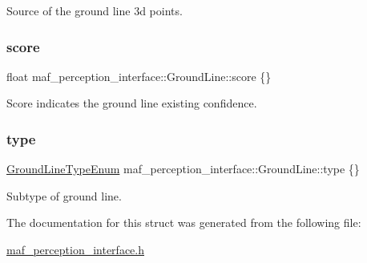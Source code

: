 Source of the ground line 3d points. 

\mbox{\label{structmaf__perception__interface_1_1GroundLine_a2ae2c5f4b0dd669de6225478eb4f5006}} 
\subsubsection{\texorpdfstring{score}{score}}
{\footnotesize\ttfamily float maf\+\_\+perception\+\_\+interface\+::\+Ground\+Line\+::score \{\}}



Score indicates the ground line existing confidence. 

\mbox{\label{structmaf__perception__interface_1_1GroundLine_a1c29c46eaad71b036c40cd5dbfe483c6}} 
\subsubsection{\texorpdfstring{type}{type}}
{\footnotesize\ttfamily \hyperlink{structmaf__perception__interface_1_1GroundLineTypeEnum}{Ground\+Line\+Type\+Enum} maf\+\_\+perception\+\_\+interface\+::\+Ground\+Line\+::type \{\}}



Subtype of ground line. 



The documentation for this struct was generated from the following file\+:\begin{DoxyCompactItemize}
\item 
\hyperlink{maf__perception__interface_8h}{maf\+\_\+perception\+\_\+interface.\+h}\end{DoxyCompactItemize}
